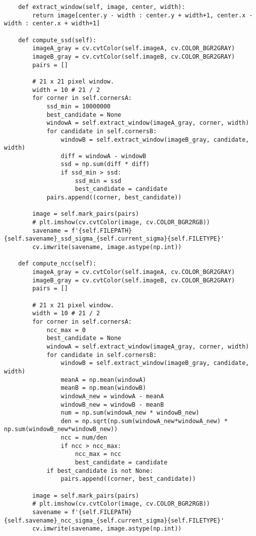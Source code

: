 \documentclass[11pt]{article}
\begin{document}
\begin{lstlisting}
    def extract_window(self, image, center, width):
        return image[center.y - width : center.y + width+1, center.x - width : center.x + width+1]

    def compute_ssd(self):
        imageA_gray = cv.cvtColor(self.imageA, cv.COLOR_BGR2GRAY)
        imageB_gray = cv.cvtColor(self.imageB, cv.COLOR_BGR2GRAY)
        pairs = []

        # 21 x 21 pixel window. 
        width = 10 # 21 / 2
        for corner in self.cornersA:
            ssd_min = 10000000
            best_candidate = None
            windowA = self.extract_window(imageA_gray, corner, width)
            for candidate in self.cornersB:
                windowB = self.extract_window(imageB_gray, candidate, width)
                diff = windowA - windowB
                ssd = np.sum(diff * diff)
                if ssd_min > ssd:
                    ssd_min = ssd
                    best_candidate = candidate
            pairs.append((corner, best_candidate))

        image = self.mark_pairs(pairs)
        # plt.imshow(cv.cvtColor(image, cv.COLOR_BGR2RGB))
        savename = f'{self.FILEPATH}{self.savename}_ssd_sigma_{self.current_sigma}{self.FILETYPE}'
        cv.imwrite(savename, image.astype(np.int))

    def compute_ncc(self):
        imageA_gray = cv.cvtColor(self.imageA, cv.COLOR_BGR2GRAY)
        imageB_gray = cv.cvtColor(self.imageB, cv.COLOR_BGR2GRAY)
        pairs = []

        # 21 x 21 pixel window. 
        width = 10 # 21 / 2
        for corner in self.cornersA:
            ncc_max = 0
            best_candidate = None
            windowA = self.extract_window(imageA_gray, corner, width)
            for candidate in self.cornersB:
                windowB = self.extract_window(imageB_gray, candidate, width)
                meanA = np.mean(windowA)
                meanB = np.mean(windowB)
                windowA_new = windowA - meanA
                windowB_new = windowB - meanB
                num = np.sum(windowA_new * windowB_new)
                den = np.sqrt(np.sum(windowA_new*windowA_new) * np.sum(windowB_new*windowB_new))
                ncc = num/den
                if ncc > ncc_max:
                    ncc_max = ncc
                    best_candidate = candidate
            if best_candidate is not None:
                pairs.append((corner, best_candidate))

        image = self.mark_pairs(pairs)
        # plt.imshow(cv.cvtColor(image, cv.COLOR_BGR2RGB))
        savename = f'{self.FILEPATH}{self.savename}_ncc_sigma_{self.current_sigma}{self.FILETYPE}'
        cv.imwrite(savename, image.astype(np.int))


\end{lstlisting}
\end{document}

